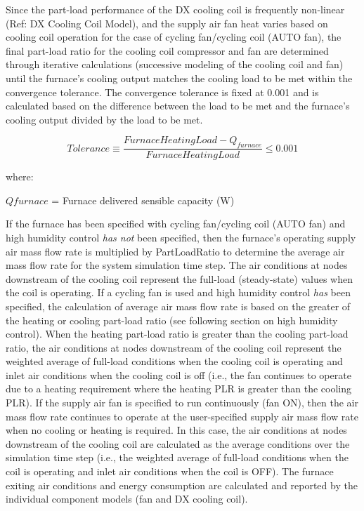 Since the part-load performance of the DX cooling coil is frequently non-linear (Ref: DX Cooling Coil Model), and the supply air fan heat varies based on cooling coil operation for the case of cycling fan/cycling coil (AUTO fan), the final part-load ratio for the cooling coil compressor and fan are determined through iterative calculations (successive modeling of the cooling coil and fan) until the furnace's cooling output matches the cooling load to be met within the convergence tolerance. The convergence tolerance is fixed at 0.001 and is calculated based on the difference between the load to be met and the furnace's cooling output divided by the load to be met.

\begin{equation}
  Tolerance \equiv \frac{FurnaceHeatingLoad - Q_{furnace}}{FurnaceHeatingLoad} \leq 0.001
\end{equation}

where:

\(Qfurnace\) = Furnace delivered sensible capacity (W)

If the furnace has been specified with cycling fan/cycling coil (AUTO fan) and high humidity control \emph{has not} been specified, then the furnace's operating supply air mass flow rate is multiplied by PartLoadRatio to determine the average air mass flow rate for the system simulation time step. The air conditions at nodes downstream of the cooling coil represent the full-load (steady-state) values when the coil is operating. If a cycling fan is used and high humidity control \emph{has} been specified, the calculation of average air mass flow rate is based on the greater of the heating or cooling part-load ratio (see following section on high humidity control). When the heating part-load ratio is greater than the cooling part-load ratio, the air conditions at nodes downstream of the cooling coil represent the weighted average of full-load conditions when the cooling coil is operating and inlet air conditions when the cooling coil is off (i.e., the fan continues to operate due to a heating requirement where the heating PLR is greater than the cooling PLR). If the supply air fan is specified to run continuously (fan ON), then the air mass flow rate continues to operate at the user-specified supply air mass flow rate when no cooling or heating is required. In this case, the air conditions at nodes downstream of the cooling coil are calculated as the average conditions over the simulation time step (i.e., the weighted average of full-load conditions when the coil is operating and inlet air conditions when the coil is OFF). The furnace exiting air conditions and energy consumption are calculated and reported by the individual component models (fan and DX cooling coil).

